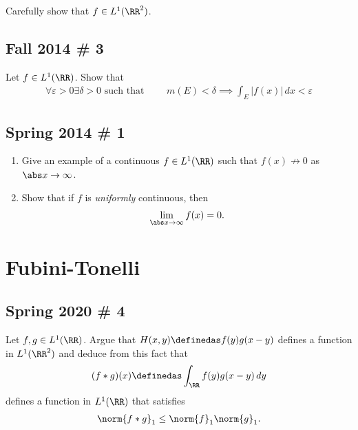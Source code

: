 Carefully show that \(f \in L^1(\RR^2)\).

\hypertarget{fall-2014-3}{%
\subsection{Fall 2014 \# 3}\label{fall-2014-3}}

Let \(f\in L^1(\RR)\). Show that
\begin{align*}
\forall\varepsilon > 0 \exists \delta > 0 \text{ such that } \qquad 
m(E) < \delta 
\implies 
\int _{E} |f(x)| \, dx < \varepsilon
\end{align*}

\hypertarget{spring-2014-1}{%
\subsection{Spring 2014 \# 1}\label{spring-2014-1}}

\begin{enumerate}
\def\labelenumi{\arabic{enumi}.}
\item
  Give an example of a continuous \(f\in L^1(\RR)\) such that
  \(f(x) \not\to 0\) as\(\abs x \to \infty\).
\item
  Show that if \(f\) is \emph{uniformly} continuous, then
  \begin{align*}
  \lim_{\abs x \to \infty} f(x) = 0.
  \end{align*}
\end{enumerate}

\hypertarget{fubini-tonelli}{%
\section{Fubini-Tonelli}\label{fubini-tonelli}}

\hypertarget{spring-2020-4}{%
\subsection{Spring 2020 \# 4}\label{spring-2020-4}}

Let \(f, g\in L^1(\RR)\). Argue that \(H(x, y) \definedas f(y) g(x-y)\)
defines a function in \(L^1(\RR^2)\) and deduce from this fact that
\begin{align*}
(f\ast g)(x) \definedas \int_\RR f(y) g(x-y) \,dy
\end{align*} defines a function in \(L^1(\RR)\) that satisfies
\begin{align*}
\norm{f\ast g}_1 \leq \norm{f}_1 \norm{g}_1
.\end{align*}

